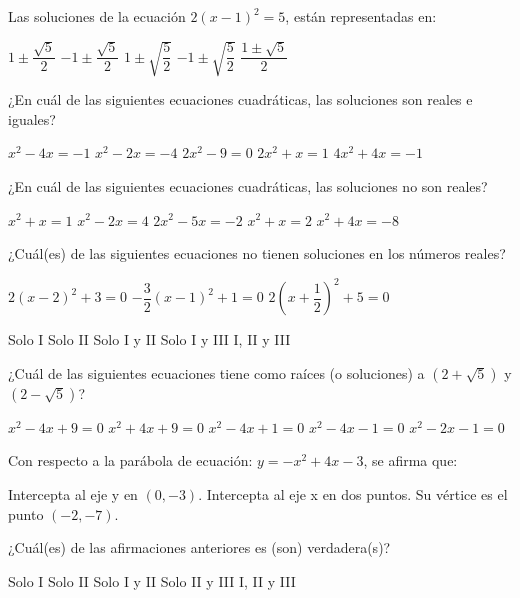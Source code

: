 \documentclass[sin nombre]{srs}
\begin{document}
\separador
\begin{preguntas}[after-item-skip=2cm]
\pregunta Las soluciones de la ecuación $2\left(x - 1\right)^{2} = 5$, están representadas en:
\begin{vertical}
\alternativa $1 \pm \dfrac{\sqrt{5}}{2}$
\alternativa $-1 \pm \dfrac{\sqrt{5}}{2}$
\alternativa $1 \pm \sqrt{\dfrac{5}{2}}$
\alternativa $-1 \pm \sqrt{\dfrac{5}{2}}$
\alternativa $\dfrac{1 \pm \sqrt{5}}{2}$
\end{vertical}

\pregunta ¿En cuál de las siguientes ecuaciones cuadráticas, las soluciones son reales e iguales?
\begin{vertical}
\alternativa $x^{2} - 4x = -1$
\alternativa $x^{2} - 2x = -4$
\alternativa $2x^{2}-9=0$
\alternativa $2x^{2} + x = 1$
\alternativa $4x^{2} + 4x =-1$
\end{vertical}

\pregunta ¿En cuál de las siguientes ecuaciones cuadráticas, las soluciones no son reales?
\begin{vertical}
\alternativa $x^{2} + x = 1$
\alternativa $x^{2} - 2x = 4$
\alternativa $2x^{2} - 5x = -2$
\alternativa $x^{2} + x = 2$
\alternativa $x^{2} + 4x = -8$
\end{vertical}

\pregunta ¿Cuál(es) de las siguientes ecuaciones no tienen soluciones en los números reales?
\begin{verticali}
\alternativa $2\left(x - 2\right)^{2} + 3 = 0$
\alternativa $-\dfrac{3}{2}\left(x - 1\right)^{2} + 1 = 0$
\alternativa $2\left(x + \dfrac{1}{2}\right)^{2} + 5 = 0$
\end{verticali}
\begin{vertical}
\alternativa Solo I
\alternativa Solo II
\alternativa Solo I y II
\alternativa Solo I y III
\alternativa I, II y III
\end{vertical}

\pregunta ¿Cuál de las siguientes ecuaciones tiene como raíces (o soluciones) a $\left(2 + \sqrt{5}\right)$ y $\left(2 - \sqrt{5}\right)$?
\begin{vertical}
\alternativa $x^{2} - 4x + 9=0$
\alternativa $x^{2} + 4x + 9 =0$
\alternativa $x^{2} - 4x + 1 =0$
\alternativa $x^{2} - 4x - 1 = 0$
\alternativa $x^{2}-2x-1=0$
\end{vertical}

\pregunta Con respecto a la parábola de ecuación: $y = -x^{2} + 4x - 3$, se afirma que:
\begin{verticali}
\alternativa Intercepta al eje y en $\left(0,-3\right)$.
\alternativa Intercepta al eje x en dos puntos.
\alternativa Su vértice es el punto $\left(-2,-7\right)$.
\end{verticali}
¿Cuál(es) de las afirmaciones anteriores es (son) verdadera(s)?
\begin{vertical}
\alternativa Solo I
\alternativa Solo II
\alternativa Solo I y II
\alternativa Solo II y III
\alternativa I, II y III
\end{vertical}


\end{preguntas}
\end{document}
